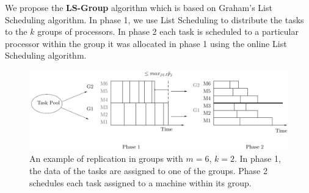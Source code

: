  We propose the \textbf{LS-Group} algorithm which is based on Graham's
 List Scheduling algorithm. In phase 1, we use List Scheduling to
 distribute the tasks to the $k$ groups of processors. In phase 2 each
 task is scheduled to a particular processor within the group it was
 allocated in phase 1 using the online List Scheduling algorithm.
 
 \begin{figure}[htp] 
 \centering
 \includegraphics[width=\linewidth]{model3.pdf}
 \caption{An example of replication in groups with $m = 6$, $k = 2$. In
   phase 1, the data of the tasks are assigned to one of the
   groups. Phase 2 schedules each task assigned to a machine within its
   group.}
 \label{fig:Model 3}
 \end{figure}
 
